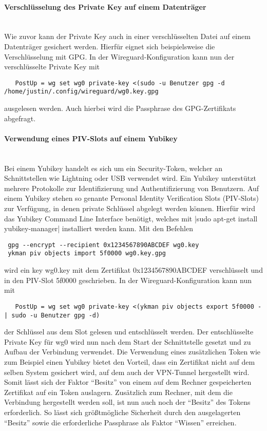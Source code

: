 \paragraph{Verschl\"usselung des Private Key auf einem Datentr\"ager}
\noindent \\Wie zuvor kann der Private Key auch in einer verschl\"usselten Datei auf einem Datentr\"ager gesichert werden. Hierfür eignet sich beispielsweise die Verschl\"usselung mit GPG. In der Wireguard-Konfiguration kann nun der verschl\"usselte Private Key mit 
\begin{verbatim}
   PostUp = wg set wg0 private-key <(sudo -u Benutzer gpg -d /home/justin/.config/wireguard/wg0.key.gpg
\end{verbatim}
ausgelesen werden. Auch hierbei wird die Passphrase des GPG-Zertifikats abgefragt. 

\paragraph{Verwendung eines PIV-Slots auf einem Yubikey}
\noindent \\Bei einem Yubikey handelt es sich um ein Security-Token, welcher an Schnittstellen wie Lightning oder USB verwendet wird. Ein Yubikey unterst\"utzt mehrere Protokolle zur Identifizierung und Authentifizierung von Benutzern. Auf einem Yubikey stehen so genante Personal Identity Verification Slots (PIV-Slots) zur Verf\"ugung, in denen private Schl\"ussel abgelegt werden k\"onnen. Hierf\"ur wird das Yubikey Command Line Interface ben\"otigt, welches mit |sudo apt-get install yubikey-manager| installiert werden kann. Mit den Befehlen 
\begin{verbatim}
 gpg --encrypt --recipient 0x1234567890ABCDEF wg0.key
 ykman piv objects import 5f0000 wg0.key.gpg
\end{verbatim}
wird ein key wg0.key mit dem Zertifikat 0x1234567890ABCDEF verschl\"usselt und in den PIV-Slot 5f0000 geschrieben. In der Wireguard-Konfiguration kann nun mit
\begin{verbatim}
   PostUp = wg set wg0 private-key <(ykman piv objects export 5f0000 - | sudo -u Benutzer gpg -d)
\end{verbatim}
der Schl\"ussel aus dem Slot gelesen und entschl\"usselt werden. Der entschl\"usselte Private Key für wg0 wird nun nach dem Start der Schnittstelle gesetzt  und zu Aufbau der Verbindung verwendet. Die Verwendung eines zusätzlichen Token wie zum Beispiel einen Yubikey bietet den Vorteil, dass ein Zertifikat nicht auf dem selben System gesichert wird, auf dem auch der VPN-Tunnel hergestellt wird. Somit lässt sich der Faktor "`Besitz"' von einem auf dem Rechner gespeicherten Zertifikat auf ein Token auslagern. Zusätzlich zum Rechner, mit dem die Verbindung hergestellt werden soll, ist nun auch noch der "`Besitz"' des Tokens erforderlich. So lässt sich größtmögliche Sicherheit durch den ausgelagerten "`Besitz"' sowie die erforderliche Passphrase als Faktor "`Wissen"' erreichen.  






  
